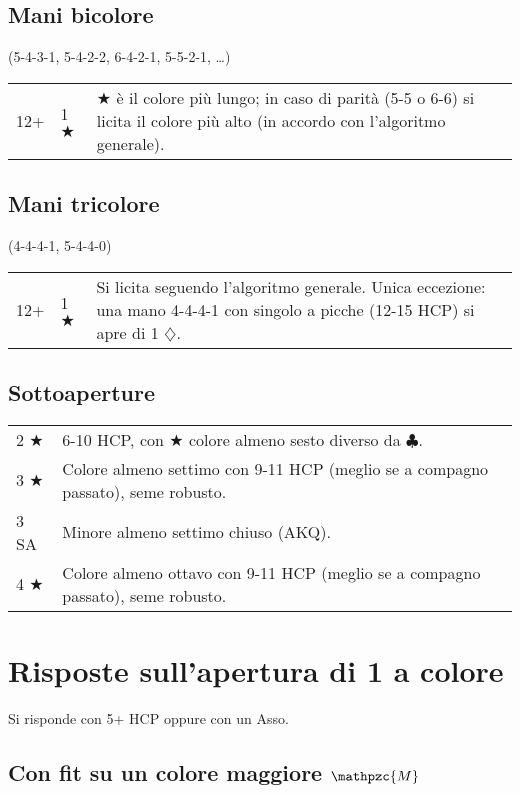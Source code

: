 \documentclass[a4paper,10pt]{article}
\renewcommand{\c}{$\clubsuit$\xspace}
\renewcommand{\d}{$\diamondsuit$\xspace}
\renewcommand{\j}{$\bigstar$\xspace}
\newcommand{\sa}{SA\xspace}
\newcommand{\M}{$\mathpzc{M}$\xspace}
\newcommand{\smallspace}{\vskip0.3cm}
\newenvironment{twocol}
  {\smallspace\noindent\begin{tabular}{l p{0.78\textwidth}}}
  {\end{tabular}\smallspace}
\newenvironment{threecol}
  {\smallspace\noindent\begin{tabular}{l l p{0.78\textwidth}}}
  {\end{tabular}\smallspace}
\begin{document}
\subsection{Mani bicolore}
(5-4-3-1, 5-4-2-2, 6-4-2-1, 5-5-2-1, \dots)

\begin{threecol}
 12+ & 1 \j & \j è il colore più lungo; in caso di parità (5-5 o 6-6) si licita il colore più alto (in accordo con l'algoritmo generale).
\end{threecol}


\subsection{Mani tricolore}
(4-4-4-1, 5-4-4-0)

\begin{threecol}
 12+ & 1 \j & Si licita seguendo l'algoritmo generale. Unica eccezione: una mano 4-4-4-1 con singolo a picche (12-15 HCP) si apre di 1 \d.
\end{threecol}


\subsection{Sottoaperture}

\begin{twocol}
 2 \j & 6-10 HCP, con \j colore almeno sesto diverso da \c.\\
 3 \j & Colore almeno settimo con 9-11 HCP (meglio se a compagno passato), seme robusto.\\
 3 \sa & Minore almeno settimo chiuso (AKQ).\\
 4 \j & Colore almeno ottavo con 9-11 HCP (meglio se a compagno passato), seme robusto.
\end{twocol}

\pagebreak

\section{Risposte sull'apertura di 1 a colore}

Si risponde con 5+ HCP oppure con un Asso.

\subsection{Con fit su un colore maggiore \M}

\end{document}
